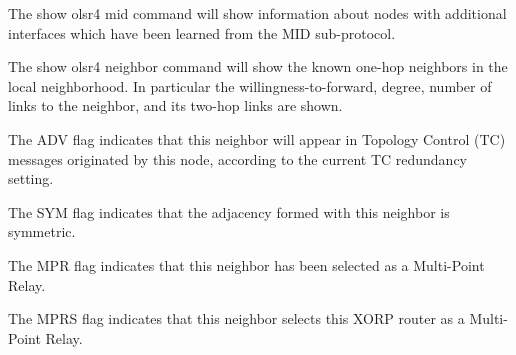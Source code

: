 The {\stt show olsr4 mid} command will show information about nodes with
additional interfaces which have been learned from the MID sub-protocol.

\vspace{0.1in}
\noindent{}

\newpage
The {\stt show olsr4 neighbor} command will show the known one-hop neighbors
in the local neighborhood. In particular the willingness-to-forward, degree,
number of links to the neighbor, and its two-hop links are shown.

The ADV flag indicates that this neighbor will appear in Topology Control (TC)
messages originated by this node, according to the current TC redundancy setting.

The SYM flag indicates that the adjacency formed with this neighbor is symmetric.

The MPR flag indicates that this neighbor has been selected as a Multi-Point Relay.

The MPRS flag indicates that this neighbor selects this XORP router as a Multi-Point Relay.

\vspace{0.1in}
\noindent{}

